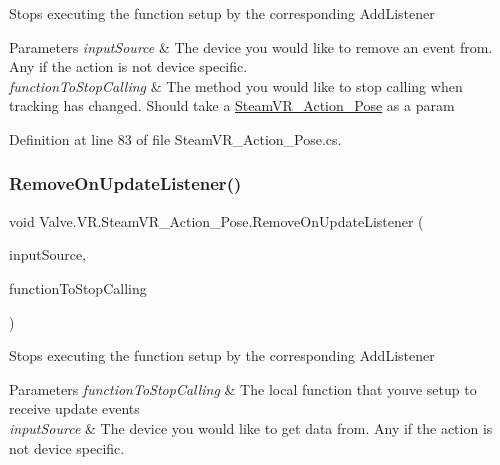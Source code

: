 Stops executing the function setup by the corresponding Add\+Listener 


\begin{DoxyParams}{Parameters}
{\em input\+Source} & The device you would like to remove an event from. Any if the action is not device specific.\\
\hline
{\em function\+To\+Stop\+Calling} & The method you would like to stop calling when tracking has changed. Should take a \mbox{\hyperlink{class_valve_1_1_v_r_1_1_steam_v_r___action___pose}{Steam\+V\+R\+\_\+\+Action\+\_\+\+Pose}} as a param\\
\hline
\end{DoxyParams}


Definition at line 83 of file Steam\+V\+R\+\_\+\+Action\+\_\+\+Pose.\+cs.

\mbox{\label{class_valve_1_1_v_r_1_1_steam_v_r___action___pose_ae825ca07325b80170162b81d48f83070}} 
\subsubsection{\texorpdfstring{RemoveOnUpdateListener()}{RemoveOnUpdateListener()}}
{\footnotesize\ttfamily void Valve.\+V\+R.\+Steam\+V\+R\+\_\+\+Action\+\_\+\+Pose.\+Remove\+On\+Update\+Listener (\begin{DoxyParamCaption}\item[{\mbox{\hyperlink{namespace_valve_1_1_v_r_a82e5bf501cc3aa155444ee3f0662853f}{Steam\+V\+R\+\_\+\+Input\+\_\+\+Sources}}}]{input\+Source,  }\item[{\mbox{\hyperlink{class_valve_1_1_v_r_1_1_steam_v_r___action___pose_a243e7046a430c572e5be3d1b6b322b6d}{Update\+Handler}}}]{function\+To\+Stop\+Calling }\end{DoxyParamCaption})}



Stops executing the function setup by the corresponding Add\+Listener 


\begin{DoxyParams}{Parameters}
{\em function\+To\+Stop\+Calling} & The local function that you\textquotesingle{}ve setup to receive update events\\
\hline
{\em input\+Source} & The device you would like to get data from. Any if the action is not device specific.\\
\hline
\end{DoxyParams}


